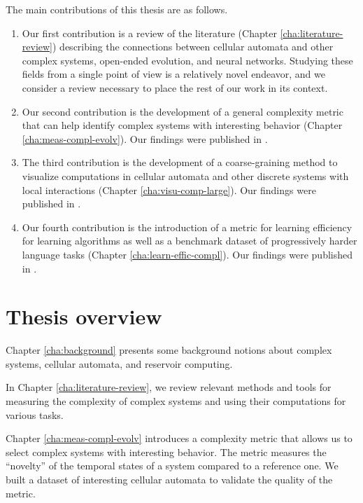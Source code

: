 The main contributions of this thesis are as follows.
\begin{enumerate}
  \item Our first contribution is a review of the literature (Chapter \ref{cha:literature-review})
        describing the connections between cellular automata
        and other complex systems, open-ended evolution, and neural networks.
        Studying these fields from a single point of view is a relatively novel
        endeavor, and we consider a review necessary to place the rest of our
        work in its context.

  \item Our second contribution is the development of a general complexity metric that can help identify
        complex systems with interesting behavior (Chapter \ref{cha:meas-compl-evolv}). Our findings were published in \cite{cisnerosEvolvingStructuresComplex2019}.

  \item The third contribution is the development of a coarse-graining method to visualize computations in
        cellular automata and other discrete systems with local interactions (Chapter \ref{cha:visu-comp-large}). Our findings were published in \cite{cisnerosVisualizingComputationLargescale2020}.

  \item Our fourth contribution is the introduction of a metric for learning efficiency for learning
        algorithms as well as a benchmark dataset of progressively harder
        language tasks (Chapter \ref{cha:learn-effic-compl}). Our findings were published in \cite{cisnerosBenchmarkingLearningEfficiency2022}.
\end{enumerate}

\section{Thesis overview}


Chapter \ref{cha:background} presents some background notions about complex
systems, cellular automata, and reservoir computing.

In Chapter \ref{cha:literature-review}, we review relevant methods and tools for
measuring the complexity of complex systems and using their computations for
various tasks.

Chapter \ref{cha:meas-compl-evolv} introduces a complexity metric that allows us 
to select complex systems with interesting behavior. The metric measures the
``novelty'' of the temporal states of a system compared to a reference one. We
built a dataset of interesting cellular automata to validate the quality of the
metric.


